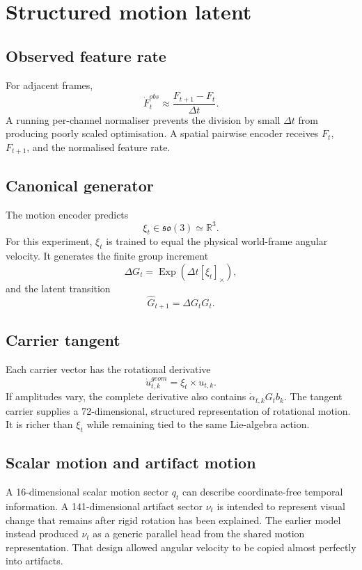 \documentclass[11pt,a4paper]{article}
\newcommand{\R}{\mathbb R}\newcommand{\SO}{\mathrm{SO}}\newcommand{\so}{\mathfrak{so}}\newcommand{\Exp}{\operatorname{Exp}}\newcommand{\sg}{\operatorname{sg}}\newcommand{\vct}[1]{\bm{#1}}
\begin{document}
\section{Structured motion latent}
\subsection{Observed feature rate}
For adjacent frames,
\begin{equation}
\dot F_t^{obs}\approx\frac{F_{t+1}-F_t}{\Delta t}.
\end{equation}
A running per-channel normaliser prevents the division by small $\Delta t$ from producing poorly scaled optimisation. A spatial pairwise encoder receives $F_t$, $F_{t+1}$, and the normalised feature rate.

\subsection{Canonical generator}
The motion encoder predicts
\begin{equation}
\xi_t\in\so(3)\simeq\R^3.
\end{equation}
For this experiment, $\xi_t$ is trained to equal the physical world-frame angular velocity. It generates the finite group increment
\begin{equation}
\Delta G_t=\Exp(\Delta t[\xi_t]_\times),
\end{equation}
and the latent transition
\begin{equation}
\hat G_{t+1}=\Delta G_tG_t.
\end{equation}

\subsection{Carrier tangent}
Each carrier vector has the rotational derivative
\begin{equation}
\dot u_{t,k}^{geom}=\xi_t\times u_{t,k}.
\end{equation}
If amplitudes vary, the complete derivative also contains $\dot\alpha_{t,k}G_tb_k$. The tangent carrier supplies a 72-dimensional, structured representation of rotational motion. It is richer than $\xi_t$ while remaining tied to the same Lie-algebra action.

\subsection{Scalar motion and artifact motion}
A 16-dimensional scalar motion sector $q_t$ can describe coordinate-free temporal information. A 141-dimensional artifact sector $\nu_t$ is intended to represent visual change that remains after rigid rotation has been explained. The earlier model instead produced $\nu_t$ as a generic parallel head from the shared motion representation. That design allowed angular velocity to be copied almost perfectly into artifacts.
\end{document}
